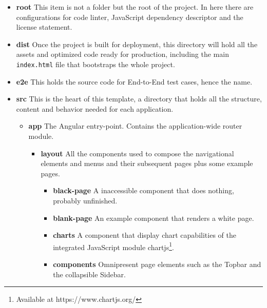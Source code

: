 \begin{itemize}
\item \textbf{root} This item is not a folder but the root of the project. In here there are configurations for code linter, JavaScript dependency descriptor and the license statement.
\item \textbf{dist} Once the project is built for deployment, this directory will hold all the assets and optimized code ready for production, including the main \texttt{index.html} file that bootstraps the whole project.
\item \textbf{e2e} This holds the source code for End-to-End test cases, hence the name.
\item \textbf{src} This is the heart of this template, a directory that holds all the structure, content and behavior needed for each application. \leavevmode

  \begin{itemize}
  \item \textbf{app} The Angular entry-point. Contains the application-wide router module.

    \begin{itemize}
    \item \textbf{layout} All the components used to compose the navigational elements and menus and their subsequent pages plus some example pages. \leavevmode

      \begin{itemize}
      \item \textbf{black-page} A inaccessible component that does nothing, probably unfinished.
      \item \textbf{blank-page} An example component that renders a white page.
      \item \textbf{charts} A component that display chart capabilities of the integrated JavaScript module chartjs\footnote{Available at https://www.chartjs.org/}.
          \item \textbf{components} Omnipresent page elements such as the Topbar and the collapsible Sidebar.


\end{itemize}
\end{itemize}
\end{itemize}
\end{itemize}
